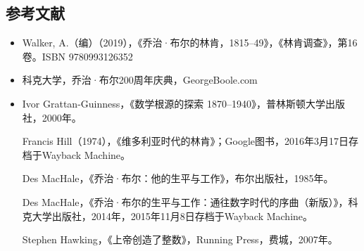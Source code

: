 \subsection{参考文献}
\begin{itemize}
\item Walker, A.（编）（2019），《乔治·布尔的林肯，1815–49》，《林肯调查》，第16卷。ISBN 9780993126352

\item 科克大学，乔治·布尔200周年庆典，GeorgeBoole.com

\item Ivor Grattan-Guinness，《数学根源的探索 1870–1940》，普林斯顿大学出版社，2000年。

Francis Hill（1974），《维多利亚时代的林肯》；Google图书，2016年3月17日存档于Wayback Machine。

Des MacHale，《乔治·布尔：他的生平与工作》，布尔出版社，1985年。

Des MacHale，《乔治·布尔的生平与工作：通往数字时代的序曲（新版）》，科克大学出版社，2014年，2015年11月8日存档于Wayback Machine。

Stephen Hawking，《上帝创造了整数》，Running Press，费城，2007年。
\end{itemize}